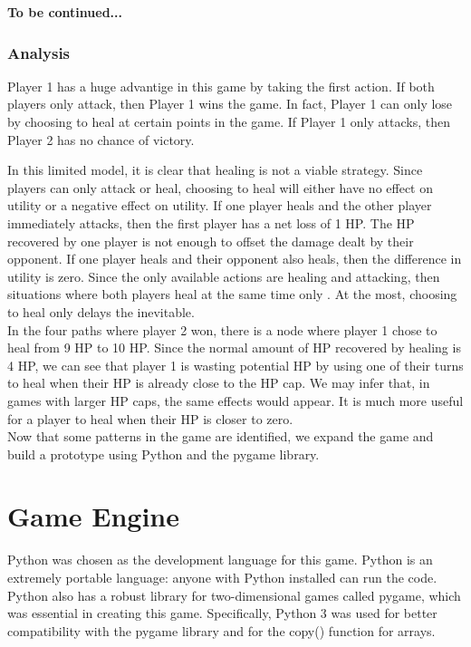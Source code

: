 \textbf{To be continued...}

\subsubsection{Analysis}
Player 1 has a huge advantige in this game by taking the first action. If both players only attack, then Player 1 wins the game. In fact, Player 1 can only lose by choosing to heal at certain points in the game. If Player 1 only attacks, then Player 2 has no chance of victory.

In this limited model, it is clear that healing is not a viable strategy. Since players can only attack or heal, choosing to heal will either have no effect on utility or a negative effect on utility. If one player heals and the other player immediately attacks, then the first player has a net loss of 1 HP. The HP recovered by one player is not enough to offset the damage dealt by their opponent. If one player heals and their opponent also heals, then the difference in utility is zero. Since the only available actions are healing and attacking, then situations where both players heal at the same time only . At the most, choosing to heal only delays the inevitable.\\

In the four paths where player 2 won, there is a node where player 1 chose to heal from 9 HP to 10 HP. Since the normal amount of HP recovered by healing is 4 HP, we can see that player 1 is wasting potential HP by using one of their turns to heal when their HP is already close to the HP cap. We may infer that, in games with larger HP caps, the same effects would appear. It is much more useful for a player to heal when their HP is closer to zero.\\

Now that some patterns in the game are identified, we expand the game and build a prototype using Python and the pygame library.

\section{Game Engine}
Python was chosen as the development language for this game. Python is an extremely portable language: anyone with Python installed can run the code. Python also has a robust library for two-dimensional games called pygame, which was essential in creating this game. Specifically, Python 3 was used for better compatibility with the pygame library and for the copy() function for arrays.

